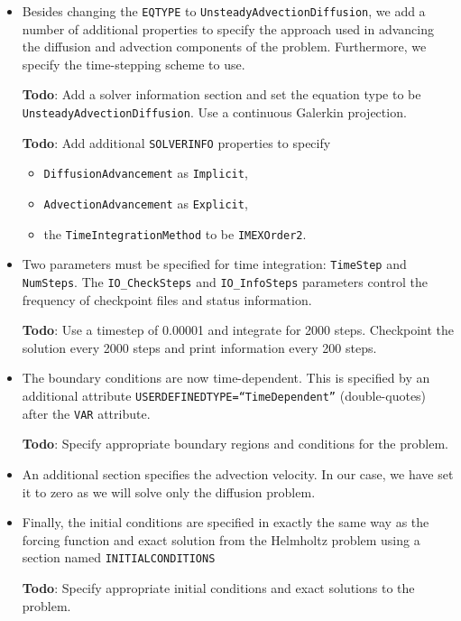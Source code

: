 \documentclass[a4paper,12pt]{article}
\begin{document}
\begin{itemize}
\item Besides changing the \texttt{EQTYPE} to
\texttt{UnsteadyAdvectionDiffusion}, we add a number of additional properties to
specify the approach used in advancing the diffusion and advection components of
the problem. Furthermore, we specify the time-stepping scheme to use.

\textbf{Todo}: Add a solver information section and set the equation type to be
\texttt{UnsteadyAdvectionDiffusion}. Use a continuous Galerkin projection.

\textbf{Todo}: Add additional \texttt{SOLVERINFO} properties to specify
\begin{itemize}
  \item \texttt{DiffusionAdvancement} as \texttt{Implicit},
  \item \texttt{AdvectionAdvancement} as \texttt{Explicit},
  \item the \texttt{TimeIntegrationMethod} to be \texttt{IMEXOrder2}. 
\end{itemize}

\item Two parameters must be specified for time integration: \texttt{TimeStep}
and \texttt{NumSteps}. The \texttt{IO\_CheckSteps} and \texttt{IO\_InfoSteps}
parameters control the frequency of checkpoint files and status information.

\textbf{Todo}: Use a timestep of 0.00001 and integrate for 2000 steps.
Checkpoint the solution every 2000 steps and print information every 200 steps.


\item The boundary conditions are now time-dependent. This is specified by an
additional attribute \texttt{USERDEFINEDTYPE=``TimeDependent''}
(double-quotes) after the \texttt{VAR} attribute.

\textbf{Todo}: Specify appropriate boundary regions and conditions for the
problem.

\item An additional section specifies the advection velocity. In our case, we
have set it to zero as we will solve only the diffusion problem.

\item Finally, the initial conditions are specified in exactly the same way as
the forcing function and exact solution from the Helmholtz problem using a
section named \texttt{INITIALCONDITIONS}

\textbf{Todo}: Specify appropriate initial conditions and exact solutions to the
problem.

\end{itemize}
\end{document}
